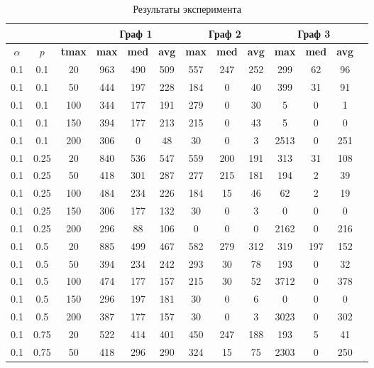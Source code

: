 
\begin{table}[H]
\centering
\caption{Результаты эксперимента}
\begin{tabular}{|c|c|c|c|c|c|c|c|c|c|c|c|c|}
\hline
\multicolumn{3}{|c|}{} & \multicolumn{3}{|c|}{Граф 1} & \multicolumn{3}{|c|}{Граф 2} & \multicolumn{3}{|c|}{Граф 3} \\ \hline
\textbf{\boldmath$\alpha$} & \textbf{\boldmath$p$} & \textbf{tmax} & \textbf{max} & \textbf{med} & \textbf{avg} & \textbf{max} & \textbf{med} & \textbf{avg} & \textbf{max} & \textbf{med} & \textbf{avg} \\ \hline
0.1 & 0.1 & 20 & 963 & 490 & 509 & 557 & 247 & 252 & 299 & 62 & 96 \\ \hline
0.1 & 0.1 & 50 & 444 & 197 & 228 & 184 & 0 & 40 & 399 & 31 & 91 \\ \hline
0.1 & 0.1 & 100 & 344 & 177 & 191 & 279 & 0 & 30 & 5 & 0 & 1 \\ \hline
0.1 & 0.1 & 150 & 394 & 177 & 213 & 215 & 0 & 43 & 5 & 0 & 0 \\ \hline
0.1 & 0.1 & 200 & 306 & 0 & 48 & 30 & 0 & 3 & 2513 & 0 & 251 \\ \hline
0.1 & 0.25 & 20 & 840 & 536 & 547 & 559 & 200 & 191 & 313 & 31 & 108 \\ \hline
0.1 & 0.25 & 50 & 418 & 301 & 287 & 277 & 215 & 181 & 194 & 2 & 39 \\ \hline
0.1 & 0.25 & 100 & 484 & 234 & 226 & 184 & 15 & 46 & 62 & 2 & 19 \\ \hline
0.1 & 0.25 & 150 & 306 & 177 & 132 & 30 & 0 & 3 & 0 & 0 & 0 \\ \hline
0.1 & 0.25 & 200 & 296 & 88 & 106 & 0 & 0 & 0 & 2162 & 0 & 216 \\ \hline
0.1 & 0.5 & 20 & 885 & 499 & 467 & 582 & 279 & 312 & 319 & 197 & 152 \\ \hline
0.1 & 0.5 & 50 & 394 & 234 & 242 & 293 & 30 & 78 & 193 & 0 & 32 \\ \hline
0.1 & 0.5 & 100 & 474 & 177 & 157 & 215 & 30 & 52 & 3712 & 0 & 378 \\ \hline
0.1 & 0.5 & 150 & 296 & 197 & 181 & 30 & 0 & 6 & 0 & 0 & 0 \\ \hline
0.1 & 0.5 & 200 & 387 & 177 & 157 & 30 & 0 & 3 & 3023 & 0 & 302 \\ \hline
0.1 & 0.75 & 20 & 522 & 414 & 401 & 450 & 247 & 188 & 193 & 5 & 41 \\ \hline
0.1 & 0.75 & 50 & 418 & 296 & 290 & 324 & 15 & 75 & 2303 & 0 & 250 \\ \hline

\end{tabular}
\end{table}
